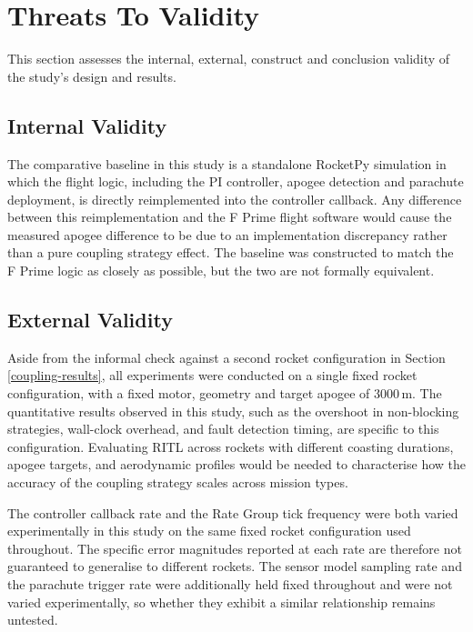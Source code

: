 \section{Threats To Validity}\label{sec:threats}

This section assesses the internal, external, construct and conclusion validity of the study's design and results.

\subsection{Internal Validity}
The comparative baseline in this study is a standalone RocketPy simulation in which the flight logic, including the PI controller, apogee detection and parachute deployment, is directly reimplemented into the controller callback. Any difference between this reimplementation and the F Prime flight software would cause the measured apogee difference to be due to an implementation discrepancy rather than a pure coupling strategy effect. The baseline was constructed to match the F Prime logic as closely as possible, but the two are not formally equivalent.


\subsection{External Validity}
Aside from the informal check against a second rocket configuration in Section \ref{coupling-results}, all experiments were conducted on a single fixed rocket configuration, with a fixed motor, geometry and target apogee of 3000\,m. The quantitative results observed in this study, such as the overshoot in non-blocking strategies, wall-clock overhead, and fault detection timing, are specific to this configuration. Evaluating RITL across rockets with different coasting durations, apogee targets, and aerodynamic profiles would be needed to characterise how the accuracy of the coupling strategy scales across mission types.


The controller callback rate and the Rate Group tick frequency were both varied experimentally in this study on the same fixed rocket configuration used throughout. The specific error magnitudes reported at each rate are therefore not guaranteed to generalise to different rockets. The sensor model sampling rate and the parachute trigger rate were additionally held fixed throughout and were not varied experimentally, so whether they exhibit a similar relationship remains untested.

